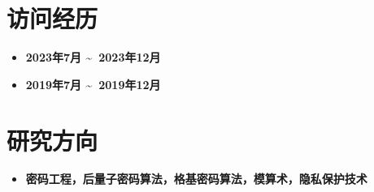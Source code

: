 \documentclass[UTF8,AutoFakeBold]{resume}
\begin{document}
\section{\hspace{0.25em}\makebox[0.75em][c]{\faGraduationCap} 
\fangsong\textbf{访问经历}}
\begin{itemize}
\item {}
{\textbf{2023年7月 \textasciitilde \ 2023年12月}}
\item {}
{\textbf{2019年7月 \textasciitilde \ 2019年12月}}
\end{itemize}
\section{\hspace{0.25em}\makebox[0.75em][c]{\faPuzzlePiece} \fangsong\textbf{研究方向}}
\begin{itemize}
\item \textbf{密码工程，后量子密码算法，格基密码算法，模算术，隐私保护技术}
\end{itemize}
\vspace{2mm}
\end{document}

